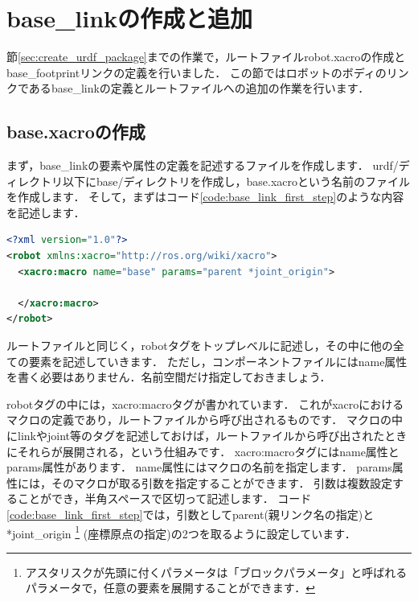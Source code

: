 \documentclass[{../../master}]{subfiles}
\begin{document}
\section{\textsf{base\_link}の作成と追加}

節\ref{sec:create_urdf_package}までの作業で，ルートファイル\textsf{robot.xacro}の作成と\textsf{base\_footprint}リンクの定義を行いました．
この節ではロボットのボディのリンクである\textsf{base\_link}の定義とルートファイルへの追加の作業を行います．

\subsection{\textsf{base.xacro}の作成}

まず，\textsf{base\_link}の要素や属性の定義を記述するファイルを作成します．
\textsf{urdf/}ディレクトリ以下に\textsf{base/}ディレクトリを作成し，\textsf{base.xacro}という名前のファイルを作成します．
そして，まずはコード\ref{code:base_link_first_step}のような内容を記述します．

\begin{lstlisting}[language=XML, caption=\textsf{base.xacro}, label=code:base_link_first_step]
<?xml version="1.0"?>
<robot xmlns:xacro="http://ros.org/wiki/xacro">
  <xacro:macro name="base" params="parent *joint_origin">
    
  </xacro:macro>
</robot>
\end{lstlisting}

ルートファイルと同じく，\textsf{robot}タグをトップレベルに記述し，その中に他の全ての要素を記述していきます．
ただし，コンポーネントファイルには\textsf{name}属性を書く必要はありません．名前空間だけ指定しておきましょう．

\textsf{robot}タグの中には，\textsf{xacro:macro}タグが書かれています．
これが\textsf{xacro}におけるマクロの定義であり，ルートファイルから呼び出されるものです．
マクロの中に\textsf{link}や\textsf{joint}等のタグを記述しておけば，ルートファイルから呼び出されたときにそれらが展開される，という仕組みです．
\textsf{xacro:macro}タグには\textsf{name}属性と\textsf{params}属性があります．
\textsf{name}属性にはマクロの名前を指定します．
\textsf{params}属性には，そのマクロが取る引数を指定することができます．
引数は複数設定することができ，半角スペースで区切って記述します．
コード\ref{code:base_link_first_step}では，引数として\textsf{parent}(親リンク名の指定)と\textsf{*joint\_origin}
\footnote{アスタリスクが先頭に付くパラメータは「ブロックパラメータ」と呼ばれるパラメータで，任意の要素を展開することができます．}
(座標原点の指定)の2つを取るように設定しています．
\end{document}
